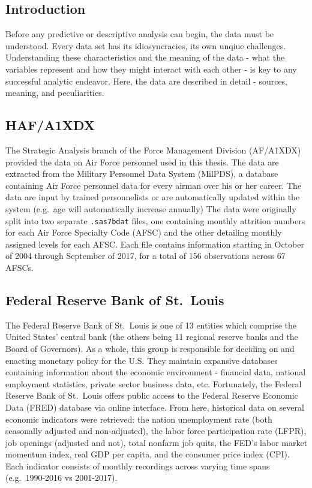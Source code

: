 \documentclass[12pt,letterpaper,toc=flat,oneside]{report}
\theoremstyle{definition}
\theoremstyle{definition}
\theoremstyle{definition}
\theoremstyle{remark}
\begin{document}
\hypertarget{introduction-1}{%
\subsection{Introduction}\label{introduction-1}}

Before any predictive or descriptive analysis can begin, the data must
be understood. Every data set has its idiosyncracies, its own unqiue
challenges. Understanding these characteristics and the meaning of the
data - what the variables represent and how they might interact with
each other - is key to any successful analytic endeavor. Here, the data
are described in detail - sources, meaning, and peculiarities.

\hypertarget{hafa1xdx}{%
\subsection{HAF/A1XDX}\label{hafa1xdx}}

The Strategic Analysis branch of the Force Management Division
(AF/A1XDX) provided the data on Air Force personnel used in this thesis.
The data are extracted from the Military Personnel Data System (MilPDS),
a database containing Air Force personnel data for every airman over his
or her career. The data are input by trained personnelists or are
automatically updated within the system (e.g.~age will automatically
increase annually) The data were originally split into two separate
\texttt{.sas7bdat} files, one containing monthly attrition numbers for
each Air Force Specialty Code (AFSC) and the other detailing monthly
assigned levels for each AFSC. Each file contains information starting
in October of 2004 through September of 2017, for a total of 156
observations across 67 AFSCs.

\hypertarget{federal-reserve-bank-of-st.louis}{%
\subsection{Federal Reserve Bank of
St.~Louis}\label{federal-reserve-bank-of-st.louis}}

The Federal Reserve Bank of St.~Louis is one of 13 entities which
comprise the United States' central bank (the others being 11 regional
reserve banks and the Board of Governors). As a whole, this group is
responsible for deciding on and enacting monetary policy for the U.S.
They maintain expansive databases containing information about the
economic environment - financial data, national employment statistics,
private sector business data, etc. Fortunately, the Federal Reserve Bank
of St.~Louis offers public access to the Federal Reserve Economic Data
(FRED) database via online interface. From here, historical data on
several economic indicators were retrieved: the nation unemployment rate
(both seasonally adjusted and non-adjusted), the labor force
participation rate (LFPR), job openings (adjusted and not), total
nonfarm job quits, the FED's labor market momentum index, real GDP per
capita, and the consumer price index (CPI). Each indicator consists of
monthly recordings across varying time spans (e.g.~1990-2016 vs
2001-2017).
\end{document}
